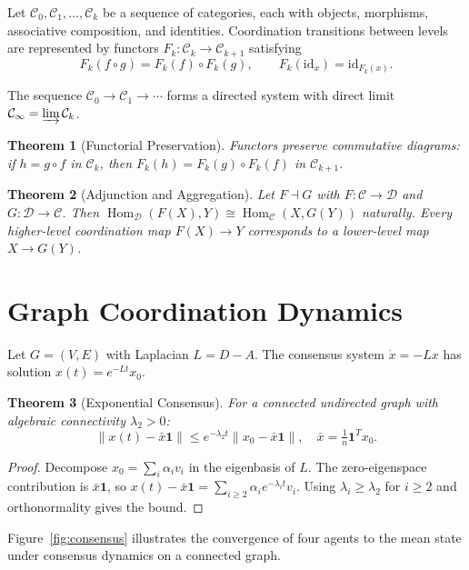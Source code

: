 \documentclass[12pt]{article}
\newtheorem{theorem}{Theorem}[section]
\DeclareMathOperator{\Hom}{Hom}
\begin{document}
Let $\mathcal{C}_0, \mathcal{C}_1, \dots, \mathcal{C}_k$ be a sequence of categories, each with objects, morphisms, associative composition, and identities. Coordination transitions between levels are represented by functors $F_k : \mathcal{C}_k \to \mathcal{C}_{k+1}$ satisfying
\[
F_k(f \circ g) = F_k(f) \circ F_k(g), \qquad F_k(\mathrm{id}_x) = \mathrm{id}_{F_k(x)}.
\]

The sequence $\mathcal{C}_0 \to \mathcal{C}_1 \to \cdots$ forms a directed system with direct limit $\mathcal{C}_\infty = \varinjlim \mathcal{C}_k$.

\begin{theorem}[Functorial Preservation]
Functors preserve commutative diagrams: if $h = g \circ f$ in $\mathcal{C}_k$, then $F_k(h) = F_k(g) \circ F_k(f)$ in $\mathcal{C}_{k+1}$.
\end{theorem}

\begin{theorem}[Adjunction and Aggregation]
Let $F \dashv G$ with $F : \mathcal{C} \to \mathcal{D}$ and $G : \mathcal{D} \to \mathcal{C}$. Then $\Hom_\mathcal{D}(F(X),Y) \cong \Hom_\mathcal{C}(X,G(Y))$ naturally. Every higher-level coordination map $F(X) \to Y$ corresponds to a lower-level map $X \to G(Y)$.
\end{theorem}

\section{Graph Coordination Dynamics}

Let $G=(V,E)$ with Laplacian $L = D - A$. The consensus system $\dot{x} = -Lx$ has solution $x(t) = e^{-Lt}x_0$.

\begin{theorem}[Exponential Consensus]
For a connected undirected graph with algebraic connectivity $\lambda_2 > 0$:
\[
\|x(t) - \bar{x}\mathbf{1}\| \le e^{-\lambda_2 t}\|x_0 - \bar{x}\mathbf{1}\|,
\quad \bar{x} = \tfrac{1}{n}\mathbf{1}^T x_0.
\]
\end{theorem}

\begin{proof}
Decompose $x_0 = \sum_i \alpha_i v_i$ in the eigenbasis of $L$. The zero-eigenspace contribution is $\bar{x}\mathbf{1}$, so $x(t) - \bar{x}\mathbf{1} = \sum_{i \ge 2} \alpha_i e^{-\lambda_i t}v_i$. Using $\lambda_i \ge \lambda_2$ for $i \ge 2$ and orthonormality gives the bound.
\end{proof}

Figure~\ref{fig:consensus} illustrates the convergence of four agents to the mean state under consensus dynamics on a connected graph.
\end{document}
